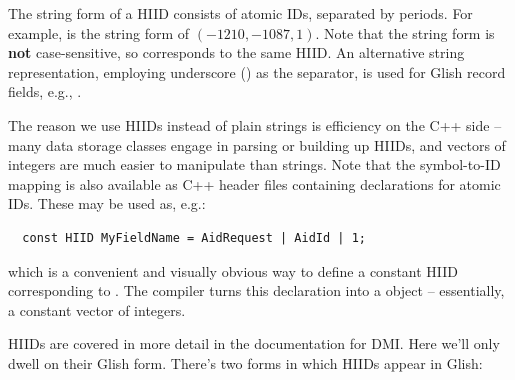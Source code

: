   The string form of a HIID consists of atomic IDs, separated by periods. For
  example,  is the string form of $(-1210,-1087,1)$. Note
  that the string form is {\bf not} case-sensitive, so 
  corresponds to the same HIID. An alternative string representation, employing
  underscore () as the separator, is used for Glish record fields,
  e.g., . 

  The reason we use HIIDs instead of plain strings is efficiency on the
  C++ side -- many data storage classes engage in parsing or building up HIIDs,
  and vectors of integers are much easier to manipulate than strings. Note that
  the symbol-to-ID mapping is also available as C++ header files containing
   declarations for atomic IDs. These may be used as, e.g.:

  \begin{verbatim}
  const HIID MyFieldName = AidRequest | AidId | 1;
  \end{verbatim}
  
  which is a convenient and visually obvious way to define a constant HIID
  corresponding to . The compiler turns this declaration
  into a  object -- essentially, a constant vector of integers.

  HIIDs are covered in more detail in the documentation for DMI. Here we'll
  only dwell on their Glish form. There's two forms in which HIIDs appear in
  Glish:
  
